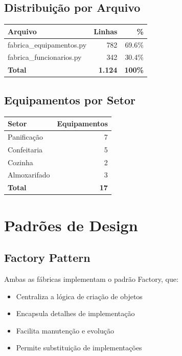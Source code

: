 \documentclass[11pt,a4paper]{article}
\begin{document}
\subsection{Distribuição por Arquivo}

\begin{tabular}{lrr}
\textbf{Arquivo} & \textbf{Linhas} & \textbf{\%} \\
\hline
fabrica\_equipamentos.py & 782 & 69.6\% \\
fabrica\_funcionarios.py & 342 & 30.4\% \\
\hline
\textbf{Total} & \textbf{1.124} & \textbf{100\%} \\
\end{tabular}

\subsection{Equipamentos por Setor}

\begin{tabular}{lr}
\textbf{Setor} & \textbf{Equipamentos} \\
\hline
Panificação & 7 \\
Confeitaria & 5 \\
Cozinha & 2 \\
Almoxarifado & 3 \\
\hline
\textbf{Total} & \textbf{17} \\
\end{tabular}

\newpage

\section{Padrões de Design}

\subsection{Factory Pattern}

Ambas as fábricas implementam o padrão Factory, que:

\begin{itemize}
    \item Centraliza a lógica de criação de objetos
    \item Encapsula detalhes de implementação
    \item Facilita manutenção e evolução
    \item Permite substituição de implementações
\end{itemize}
\end{document}
